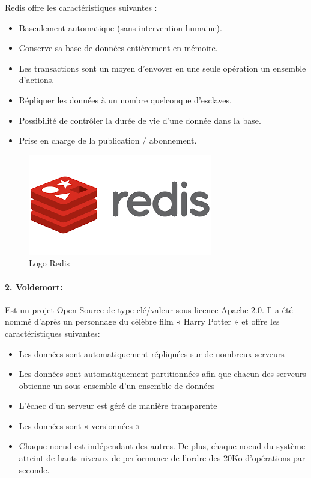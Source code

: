 Redis offre les caractéristiques suivantes :
\begin{itemize}[label=]
\item Basculement automatique (sans intervention humaine).
\item Conserve sa base de données entièrement en mémoire.
\item Les transactions sont un moyen d'envoyer en une seule opération un ensemble d'actions.
\item Répliquer les données à un nombre quelconque d'esclaves.
\item Possibilité de contrôler la durée de vie d'une donnée dans la base.
\item Prise en charge de la publication / abonnement.
\end{itemize}
\begin{figure}[h]
	\centering
    \includegraphics[scale=0.4]{img/part1/4.7}
    \caption{Logo Redis}
\end{figure}
\paragraph{2. Voldemort:}
Est un projet Open Source de type clé/valeur sous licence Apache 2.0. Il a été nommé d’après un personnage du célèbre film « Harry Potter » et offre les caractéristiques suivantes:

\begin{itemize}[label=]
\item Les données sont automatiquement répliquées sur de nombreux serveurs
\item Les données sont automatiquement partitionnées afin que chacun des serveurs obtienne un sous-ensemble d’un ensemble de données
\item L’échec d’un serveur est géré de manière transparente
\item Les données sont « versionnées »
\item Chaque noeud est indépendant des autres. De plus, chaque noeud du système atteint de hauts niveaux de performance de l’ordre des 20Ko d’opérations par seconde.
\end{itemize}

